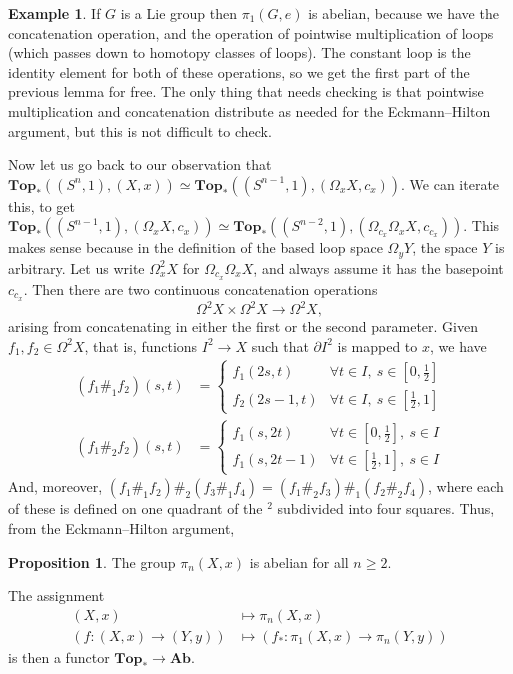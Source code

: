 \documentclass{tufte-handout}
\def\Top {\mathbf{Top}}
\def\Ab {\mathbf{Ab}}
\newcommand{\lecturenum}[1]{\marginnote{\color{red}Lecture #1}}
\theoremstyle{definition}
\newtheorem{prop}{Proposition}
\newtheorem{example}{Example}
\begin{document}
\begin{example}
If $G$ is a Lie group then $\pi_1(G,e)$ is abelian, because we have the concatenation operation, and the operation of pointwise multiplication of loops (which passes down to homotopy classes of loops). The constant loop is the identity element for both of these operations, so we get the first part of the previous lemma for free. The only thing that needs checking is that pointwise multiplication and concatenation distribute as needed for the Eckmann--Hilton argument, but this is not difficult to check.
\end{example}

Now let us go back to our observation that $\Top_*((S^n,1),(X,x)) \simeq \Top_*((S^{n-1},1),(\Omega_x X,c_x))$. We can iterate this, to get  $\Top_*((S^{n-1},1),(\Omega_x X,c_x)) \simeq \Top_*((S^{n-2},1),(\Omega_{c_x}\Omega_x X,c_{c_x}))$. This makes sense because in the definition of the based loop space $\Omega_y Y$, the space $Y$ is arbitrary. Let us write $\Omega^2_x X$ for $\Omega_{c_x}\Omega_x X$, and always assume it has the basepoint $c_{c_x}$. Then there are two continuous concatenation operations
\[
	\Omega^2 X \times \Omega^2 X \to \Omega^2 X,
\]
arising from concatenating in either the first or the second parameter. Given $f_1,f_2\in \Omega^2 X$, that is, functions $I^2\to X$ such that $\partial I^2$ is mapped to $x$, we have
\begin{align*}
(f_1 \#_1 f_2)(s,t) & = \begin{cases}
f_1(2s,t) & \forall t\in I,\ s\in [0,\frac12]\\
f_2(2s-1,t) & \forall t\in I,\ s\in [\frac12,1]
\end{cases}\\
(f_1 \#_2 f_2)(s,t) & = \begin{cases}
f_1(s,2t) & \forall t \in [0,\frac12],\ s\in I\\
f_1(s,2t-1) & \forall t\in [\frac12,1],\ s\in I
\end{cases}
\end{align*}
And, moreover, $(f_1 \#_1 f_2) \#_2 (f_3 \#_1 f_4) = (f_1 \#_2 f_3) \#_1 (f_2 \#_2 f_4)$, where each of these is defined on one quadrant of the $^2$ subdivided into four squares. Thus, from the Eckmann--Hilton argument,

\begin{prop}
The group $\pi_n(X,x)$ is abelian for all $n\geq 2$.
\end{prop}


The\lecturenum{18} assignment 
\begin{align*}
(X,x) & \mapsto \pi_n(X,x)\\
\left(f\colon (X,x) \to (Y,y) \right)& \mapsto \left(f_* \colon \pi_1(X,x) \to \pi_n(Y,y) \right)
\end{align*}
is then a functor $\Top_* \to \Ab$.
\end{document}
